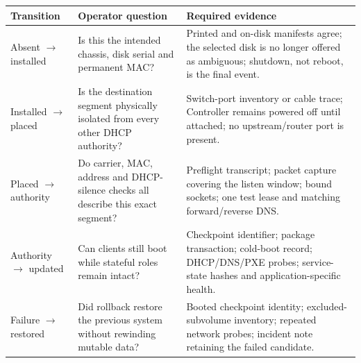 \begin{tabularx}{\linewidth}{@{}p{.18\linewidth}p{.24\linewidth}L@{}}
\toprule
\textbf{Transition} & \textbf{Operator question} & \textbf{Required evidence}\\
\midrule
Absent $\rightarrow$ installed & Is this the intended chassis, disk serial and permanent MAC? & Printed and on-disk manifests agree; the selected disk is no longer offered as ambiguous; shutdown, not reboot, is the final event.\\
Installed $\rightarrow$ placed & Is the destination segment physically isolated from every other DHCP authority? & Switch-port inventory or cable trace; Controller remains powered off until attached; no upstream/router port is present.\\
Placed $\rightarrow$ authority & Do carrier, MAC, address and DHCP-silence checks all describe this exact segment? & Preflight transcript; packet capture covering the listen window; bound sockets; one test lease and matching forward/reverse DNS.\\
Authority $\rightarrow$ updated & Can clients still boot while stateful roles remain intact? & Checkpoint identifier; package transaction; cold-boot record; DHCP/DNS/PXE probes; service-state hashes and application-specific health.\\
Failure $\rightarrow$ restored & Did rollback restore the previous system without rewinding mutable data? & Booted checkpoint identity; excluded-subvolume inventory; repeated network probes; incident note retaining the failed candidate.\\
\bottomrule
\end{tabularx}

